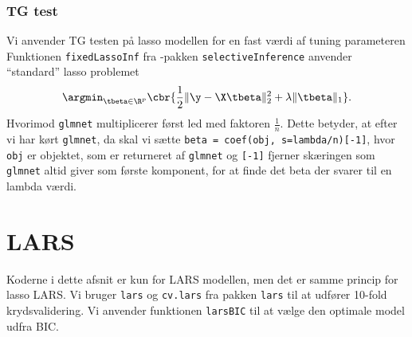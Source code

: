 \subsubsection{TG test} \label{subsubsec:inferens}
Vi anvender TG testen på lasso modellen for en fast værdi af tuning parameteren 
Funktionen \texttt{fixedLassoInf} fra \Rlang-pakken \texttt{selectiveInference}  anvender ``standard'' lasso problemet
\begin{align*}
\argmin_{\tbeta \in \R^p} \cbr{\frac{1}{2} \Vert \y - \X \tbeta \Vert_2^2 + \lambda \Vert \tbeta \Vert_1}.
\end{align*}
Hvorimod \texttt{glmnet} multiplicerer først led med faktoren \(\frac{1}{n}\).
Dette betyder, at efter vi har kørt \texttt{glmnet}, da skal vi sætte \texttt{beta = coef(obj, s=lambda/n)[-1]}, hvor \texttt{obj} er objektet, som er returneret af \texttt{glmnet} og \texttt{[-1]} fjerner skæringen som \texttt{glmnet} altid giver som første komponent, for at finde det beta der svarer til en lambda værdi.
%
%

\section{LARS} \label{subsec:lars}
Koderne i dette afsnit er kun for LARS modellen, men det er samme princip for lasso LARS. 
Vi bruger \texttt{lars} og \texttt{cv.lars} fra pakken \texttt{lars} til at udfører 10-fold krydsvalidering. 
Vi anvender funktionen \texttt{larsBIC} til at vælge den optimale model udfra BIC. 




